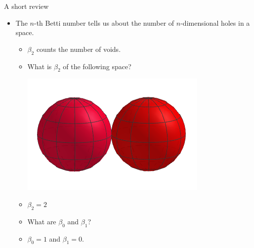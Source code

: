 \begin{frame}{A short review}
\begin{itemize}
\item The $n$-th Betti number tells us about the number of $n$-dimensional holes in a space.
	\begin{itemize}
	\item<2-> $\beta_2$ counts the number of voids.
	\item<3-> What is $\beta_2$ of the following space?
	\begin{center}
	\includegraphics[scale=0.5]{images/S2VS2}
	\end{center}
	\item<4-> $\beta_2 = 2$
	\item<5-> What are $\beta_0$ and $\beta_1$?
	\item<6-> $\beta_0 = 1$ and $\beta_1 = 0$.
	\end{itemize}
\end{itemize}
\end{frame}
